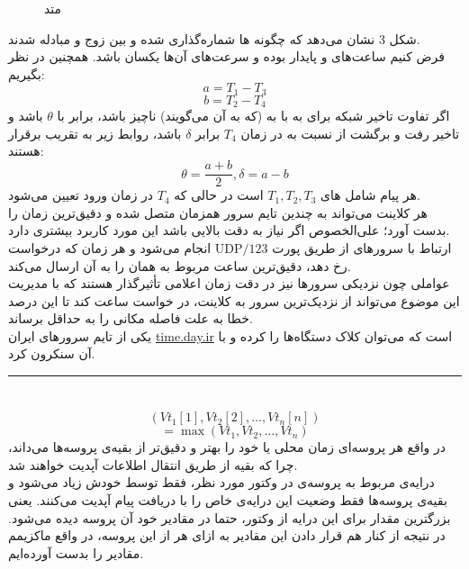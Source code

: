 \documentclass{article}
\begin{document}
\begin{multicols}{2}
\begin{figure}[H]
    \caption{متد
    }
    \label{fig:my_label}
\end{figure}
شکل 3 نشان می‌دهد که چگونه 
ها شماره‌گذاری شده و بین زوج
و
مبادله شدند.\\
فرض کنیم ساعت‌های
و
پایدار بوده و سرعت‌های آن‌ها یکسان باشد. همچنین در نظر بگیریم:
$$a = T_1 - T_3$$
$$b = T_2 - T_4$$
اگر تفاوت تاخیر شبکه برای
به
با
به
(که به آن
می‌گویند)
ناچیز باشد، 
برابر با 
$\theta$
باشد و تاخیر رفت و برگشت از
نسبت به
در زمان
$T_4$
برابر
$\delta$
باشد، روابط زیر به تقریب برقرار هستند:
$$\theta = \dfrac{a + b}{2}, \delta = a - b$$
هر پیام شامل
های 
$T_1, T_2, T_3$
است در حالی که 
$T_4$
در زمان ورود تعیین می‌شود.\\
هر کلاینت می‌تواند به چندین تایم سرور
همزمان متصل شده و دقیق‌ترین زمان را بدست آورد؛ علی‌الخصوص اگر نیاز به دقت بالایی باشد این مورد کاربرد بیشتری دارد.\\
ارتباط با سرورهای
از طریق پورت
$\text{UDP}/123$
انجام می‌شود و هر زمان که درخواست رخ دهد، دقیق‌ترین ساعت مربوط به همان
را به آن ارسال می‌کند.\\
عواملی چون نزدیکی سرورها نیز در دقت زمان اعلامی تأثیرگذار هستند که
با مدیریت این موضوع می‌تواند از نزدیک‌ترین سرور به کلاینت، در خواست ساعت کند تا این درصد خطا به علت فاصله مکانی را به حداقل برساند.\\
یکی از تایم سرورهای ایران
\url{time.day.ir}
است که می‌توان کلاک دستگاه‌ها را
کرده و با آن سنکرون کرد.
\rule{\linewidth}{1pt}

\section{}
\subsection{}
$$(Vt_1[1], Vt_2[2], \dots, Vt_n[n]) $$
$$= \max(Vt_1, Vt_2, \dots, Vt_n)$$
در واقع هر پروسه‌ای زمان محلی یا
خود را بهتر و دقیق‌تر از بقیه‌ی پروسه‌ها می‌داند، چرا که بقیه از طریق انتقال اطلاعات آپدیت خواهند شد.\\
درایه‌ی مربوط به پروسه‌ی 
در وکتور مورد نظر، فقط توسط خودش زیاد می‌شود و بقیه‌ی پروسه‌ها فقط وضعیت این درایه‌ی خاص را با دریافت پیام آپدیت می‌کنند. یعنی بزرگترین مقدار برای این درایه از وکتور، حتما در مقادیر خود آن پروسه دیده می‌شود. در نتیجه از کنار هم قرار دادن این مقادیر به ازای هر
از این 
پروسه، در واقع ماکزیمم مقادیر را بدست آورده‌ایم.


\end{multicols}
\end{document}
